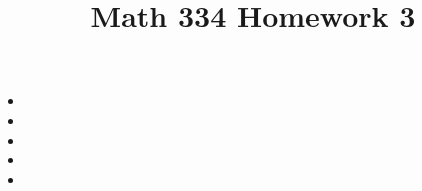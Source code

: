 \documentclass{article}
\title{Math 334 Homework 3}
\begin{document}
\maketitle
\begin{itemize}[label=]
	\item 
	\item 
	\item 
	\item 
	\item 
\end{itemize}
\end{document}
